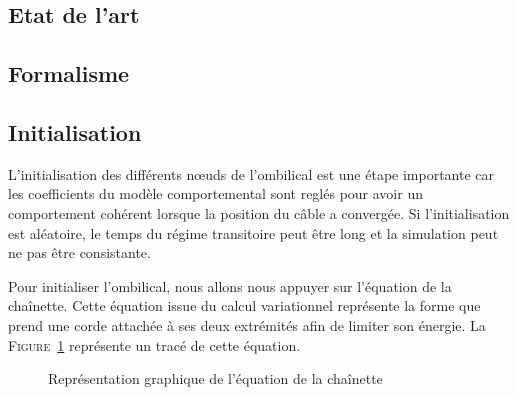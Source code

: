 \subsection{Etat de l'art}

\subsection{Formalisme}

\subsection{Initialisation}
    L'initialisation des différents n\oe uds de l'ombilical est une étape importante car les coefficients du modèle comportemental sont reglés pour avoir un comportement cohérent lorsque la position du câble a convergée. Si l'initialisation est aléatoire, le temps du régime transitoire peut être long et la simulation peut ne pas être consistante.

    Pour initialiser l'ombilical, nous allons nous appuyer sur l'équation de la chaînette. Cette équation issue du calcul variationnel représente la forme que prend une corde attachée à ses deux extrémités afin de limiter son énergie. La \textsc{Figure}~\ref{fig:chainette} représente un tracé de cette équation.

    \begin{figure}[!htb]
        \centering
        \caption{Représentation graphique de l'équation de la chaînette}
        \label{fig:chainette}
    \end{figure}
    

